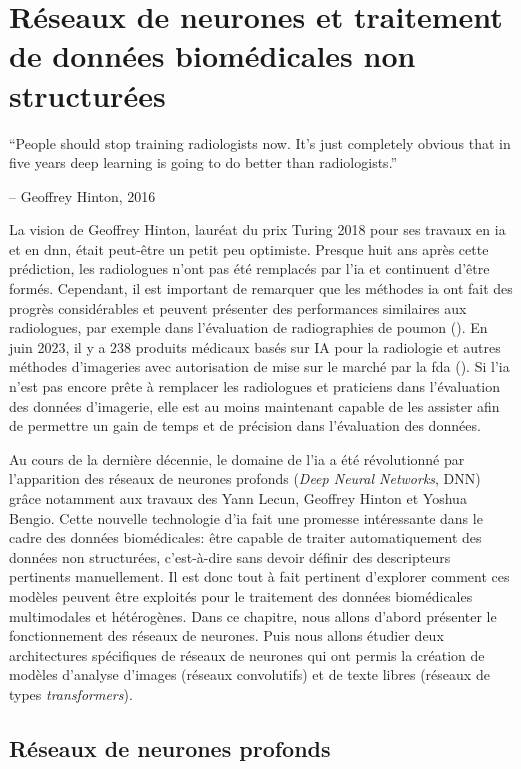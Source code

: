 \chapter{Réseaux de neurones et traitement de données biomédicales non structurées}

\epigraph{\LARGE{``People should stop training radiologists now. It's just completely obvious that in five years deep learning is going to do better than radiologists.''}}{\LARGE{-- Geoffrey Hinton, 2016}}


La vision de Geoffrey Hinton, lauréat du prix Turing 2018 pour ses travaux en \gls{ia} et en \gls{dnn}, était peut-être un petit peu optimiste. Presque huit ans après cette prédiction, les radiologues n'ont pas été remplacés par l'\gls{ia} et continuent d'être formés. Cependant, il est important de remarquer que les méthodes \gls{ia} ont fait des progrès considérables et peuvent présenter des performances similaires aux radiologues, par exemple dans l'évaluation de radiographies de poumon (\cite{frauke_rudolf_ai_2023}). En juin 2023, il y a 238 produits médicaux basés sur IA pour la radiologie et autres méthodes d'imageries avec autorisation de mise sur le marché par la \gls{fda} (\cite{keith_j_dreyer_acr_2023}). Si l'\gls{ia} n'est pas encore prête à remplacer les radiologues et praticiens dans l'évaluation des données d'imagerie, elle est au moins maintenant capable de les assister afin de permettre un gain de temps et de précision dans l'évaluation des données.


Au cours de la dernière décennie, le domaine de l'\gls{ia} a été révolutionné par l'apparition des réseaux de neurones profonds (\textit{Deep Neural Networks}, DNN) grâce notamment aux travaux des Yann Lecun, Geoffrey Hinton et Yoshua Bengio. Cette nouvelle technologie d'\gls{ia} fait une promesse intéressante dans le cadre des données biomédicales: être capable de traiter automatiquement des données non structurées, c’est-à-dire sans devoir définir des descripteurs pertinents manuellement. Il est donc tout à fait pertinent d'explorer comment ces modèles peuvent être exploités pour le traitement des données biomédicales multimodales et hétérogènes. Dans ce chapitre, nous allons d'abord présenter le fonctionnement des réseaux de neurones. Puis nous allons étudier deux architectures spécifiques de réseaux de neurones qui ont permis la création de modèles d'analyse d'images (réseaux convolutifs)  et de texte libres (réseaux de types \textit{transformers}).

\section{Réseaux de neurones profonds}


